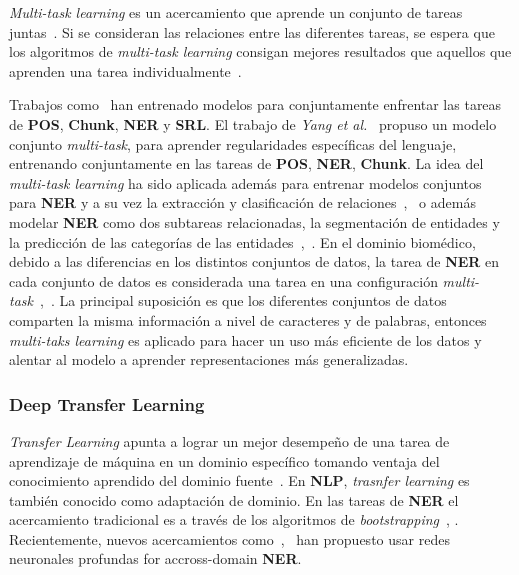 \emph{Multi-task learning} es un acercamiento que aprende un conjunto de tareas juntas~\cite{caruana1997multitask}. Si se consideran las relaciones entre las diferentes tareas, se espera que los algoritmos de \emph{multi-task learning} consigan mejores resultados que aquellos que aprenden una tarea individualmente~\cite{li2018survey}.

Trabajos como~\cite{collobert2011natural} han entrenado modelos para conjuntamente enfrentar las tareas de \textbf{POS}, \textbf{Chunk}, \textbf{NER} y \textbf{SRL}. El trabajo de \emph{Yang et al.}~\cite{yang2016multi} propuso un modelo conjunto \emph{multi-task}, para aprender regularidades espec\'ificas del lenguaje, entrenando conjuntamente en las tareas de \textbf{POS}, \textbf{NER}, \textbf{Chunk}. La idea del \emph{multi-task learning} ha sido aplicada adem\'as para entrenar modelos conjuntos para \textbf{NER} y a su vez la extracci\'on y clasificaci\'on de relaciones~\cite{zheng2017joint},~\cite{zhou2017joint} o adem\'as modelar \textbf{NER} como dos subtareas relacionadas, la segmentaci\'on de entidades y la predicci\'on de las categor\'ias  de las entidades~\cite{aguilar2019multi},~\cite{peng2016multi}. En el dominio biom\'edico, debido a las diferencias en los distintos conjuntos de datos, la tarea de \textbf{NER} en cada conjunto de datos es considerada una tarea en una configuraci\'on \emph{multi-task}~\cite{crichton2017neural},~\cite{wang2019cross}. La principal suposici\'on es que los diferentes conjuntos de datos comparten la misma informaci\'on a nivel de caracteres y de palabras, entonces \emph{multi-taks learning} es aplicado para hacer un uso m\'as eficiente de los datos y alentar al modelo a aprender representaciones m\'as generalizadas.


\subsubsection{Deep Transfer Learning}

\emph{Transfer Learning} apunta a lograr un mejor desempe\~no de una tarea de aprendizaje de m\'aquina en un dominio espec\'ifico tomando ventaja del conocimiento aprendido del dominio fuente~\cite{pan2009survey}. En \textbf{NLP}, \emph{trasnfer learning} es tambi\'en conocido como adaptaci\'on de dominio. En las tareas de \textbf{NER} el acercamiento tradicional es a trav\'es de los algoritmos de \emph{bootstrapping}~\cite{jiang2007instance}, \cite{wu2009domain}. Recientemente, nuevos acercamientos como~\cite{pan2013transfer},~\cite{lee2017transfer} han propuesto usar redes neuronales profundas for accross-domain \textbf{NER}.

